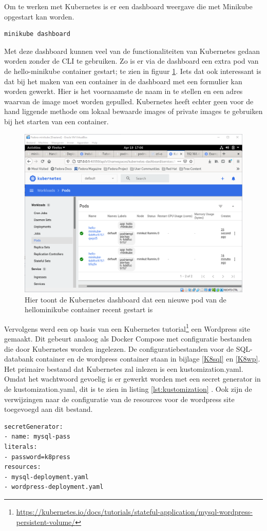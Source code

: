 Om te werken met Kubernetes is er een dashboard weergave die met Minikube opgestart kan worden.
\begin{verbatim}
minikube dashboard
\end{verbatim}
Met deze dashboard kunnen veel van de functionaliteiten van Kubernetes gedaan worden zonder de CLI te gebruiken.  Zo is er via de dashboard een extra pod van de hello-minikube container gestart; te zien in figuur \ref{fig:kubenetesDash}. Iets dat ook interessant is dat bij het maken van een container in de dashboard met een formulier kan worden gewerkt. Hier is het voornaamste de naam in te stellen en een adres waarvan de image moet worden gepulled. Kubernetes heeft echter geen voor de hand liggende methode om lokaal bewaarde images of private images te gebruiken bij het starten van een container.
\begin{figure}[h]
    \includegraphics[width=\linewidth]{img/kubenetesDash.png}
    \caption[Het kubernetes Dashboard]{Hier toont de Kubernetes dashboard dat een nieuwe pod van de hellominikube container recent gestart is}
    \label{fig:kubenetesDash}
    \centering
\end{figure}

Vervolgens werd een op basis van een Kubernetes tutorial\footnote{\url{https://kubernetes.io/docs/tutorials/stateful-application/mysql-wordpress-persistent-volume/}}  een Wordpress site gemaakt. Dit gebeurt analoog als Docker Compose met configuratie bestanden die door Kubernetes worden ingelezen. De configuratiebestanden voor de SQL-databank container en de wordpress container staan in bijlage \ref{K8sql} en \ref{K8wp}. Het primaire bestand dat Kubernetes zal inlezen is een kustomization.yaml. Omdat het wachtwoord gevoelig is er gewerkt worden met een secret generator in de kustomization.yaml, dit is te zien in listing \ref{lst:kustomization} . Ook zijn de verwijzingen naar de configuratie van de resources voor de wordpress site toegevoegd aan dit bestand.
\begin{lstlisting}[caption=inhoud van kustomization.yaml,label=lst:kustomization]
secretGenerator:
- name: mysql-pass
literals:
- password=k8press
resources:
- mysql-deployment.yaml
- wordpress-deployment.yaml
\end{lstlisting}

